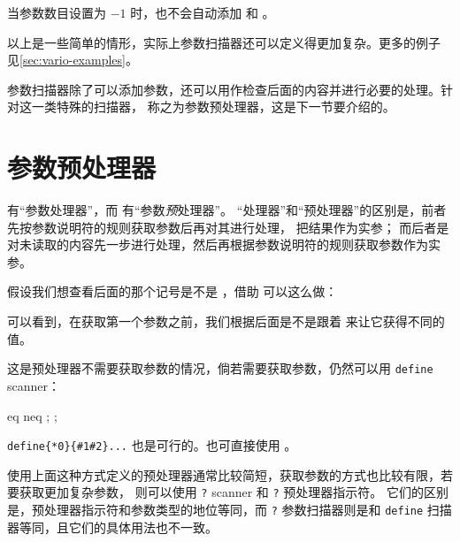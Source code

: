 \documentclass[openany]{book}
\newcounter{example}
\begin{document}
当参数数目设置为 $-1$ 时，也不会自动添加  和 
。

以上是一些简单的情形，实际上参数扫描器还可以定义得更加复杂。更多的例子
见\cref{sec:vario-examples}。

参数扫描器除了可以添加参数，还可以用作检查后面的内容并进行必要的处理。针对这一类特殊的扫描器，
称之为参数预处理器，这是下一节要介绍的。

\section{参数预处理器}

 有“参数处理器”，而  有“参数\emph{预}处理器”。
“处理器”和“预处理器”的区别是，前者先按参数说明符的规则获取参数后再对其进行处理，
把结果作为实参；
而后者是对未读取的内容先一步进行处理，然后再根据参数说明符的规则获取参数作为实参。

假设我们想查看后面的那个记号是不是 ，借助 
 可以这么做：
可以看到，在获取第一个参数之前，我们根据后面是不是跟着  来让它获得不同的值。

这是预处理器不需要获取参数的情况，倘若需要获取参数，仍然可以用 \texttt{define} scanner：
\begin{examcode}{}
\ExplSyntaxOn
\DeclareEKeysCommand {} {  { eq } { neq } }
\ExplSyntaxOff
{}; ;
\end{examcode}
\verb|define{*0}{#1#2}...| 也是可行的。也可直接使用 。

使用上面这种方式定义的预处理器通常比较简短，获取参数的方式也比较有限，若要获取更加复杂参数，
则可以使用 \texttt? scanner 和 \texttt? 预处理器指示符。
它们的区别是，预处理器指示符和参数类型的地位等同，而 \texttt? 参数扫描器则是和 \texttt{define}
扫描器等同，且它们的具体用法也不一致。
\end{document}
